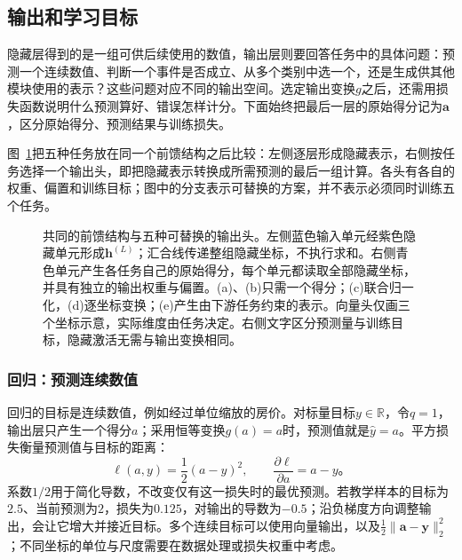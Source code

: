 \subsection{输出和学习目标}
\label{sec:ffn-output-objectives}

隐藏层得到的是一组可供后续使用的数值，输出层则要回答任务中的具体问题：预测一个连续数值、判断一个事件是否成立、从多个类别中选一个，还是生成供其他模块使用的表示？这些问题对应不同的输出空间。选定输出变换$g$之后，还需用损失函数说明什么预测算好、错误怎样计分。下面始终把最后一层的原始得分记为$\bm{a}$，区分原始得分、预测结果与训练损失。

图~\ref{fig:ffn-output-heads}把五种任务放在同一个前馈结构之后比较：左侧逐层形成隐藏表示，右侧按任务选择一个输出头，即把隐藏表示转换成所需预测的最后一组计算。各头有各自的权重、偏置和训练目标；图中的分支表示可替换的方案，并不表示必须同时训练五个任务。

\begin{figure}[!htb]
  \centering
  
  \caption{共同的前馈结构与五种可替换的输出头。左侧蓝色输入单元经紫色隐藏单元形成$\bm{h}^{(L)}$；汇合线传递整组隐藏坐标，不执行求和。右侧青色单元产生各任务自己的原始得分，每个单元都读取全部隐藏坐标，并具有独立的输出权重与偏置。(a)、(b)只需一个得分；(c)联合归一化，(d)逐坐标变换；(e)产生由下游任务约束的表示。向量头仅画三个坐标示意，实际维度由任务决定。右侧文字区分预测量与训练目标，隐藏激活无需与输出变换相同。}
  \label{fig:ffn-output-heads}
\end{figure}

\subsubsection{回归：预测连续数值}
\label{sec:ffn-output-regression}

回归的目标是连续数值，例如经过单位缩放的房价。对标量目标$y\in\mathbb{R}$，令$q=1$，输出层只产生一个得分$a$；采用恒等变换$g(a)=a$时，预测值就是$\widehat y=a$。平方损失衡量预测值与目标的距离：
\begin{equation}
  \ell(a,y)=\frac12(a-y)^2,
  \qquad \frac{\partial\ell}{\partial a}=a-y\text{。}
  \label{eq:ffn-regression-loss}
\end{equation}
系数$1/2$用于简化导数，不改变仅有这一损失时的最优预测。若教学样本的目标为$2.5$、当前预测为$2$，损失为$0.125$，对输出的导数为$-0.5$；沿负梯度方向调整输出，会让它增大并接近目标。多个连续目标可以使用向量输出，以及$\frac12\lVert\bm{a}-\bm{y}\rVert_2^2$；不同坐标的单位与尺度需要在数据处理或损失权重中考虑。

